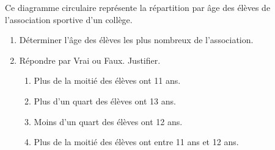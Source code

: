 \begin{exercice*}
    Ce diagramme circulaire représente la répartition par âge des élèves de l'association sportive d'un collège.

    \begin{enumerate}
        \item Déterminer l'âge des élèves les plus nombreux de l'association.
        \item Répondre par Vrai ou Faux. Justifier.
        \begin{enumerate}
            \item Plus de la moitié des élèves ont 11 ans.
            \item Plus d'un quart des élèves ont 13 ans.
            \item Moins d'un quart des élèves ont 12 ans.
            \item Plus de la moitié des élèves ont entre 11 ans et 12 ans.
        \end{enumerate}
    \end{enumerate}
\end{exercice*}
